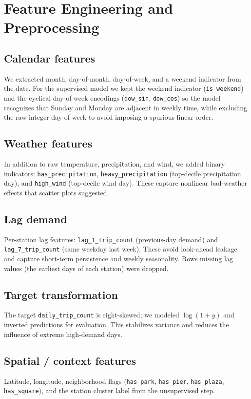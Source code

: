 \documentclass[11pt]{article}
\begin{document}
\section{Feature Engineering and Preprocessing}

\subsection{Calendar features}
We extracted month, day-of-month, day-of-week, and a weekend indicator from
the date. For the supervised model we kept the weekend indicator
(\texttt{is\_weekend}) and the cyclical day-of-week encodings
(\texttt{dow\_sin}, \texttt{dow\_cos}) so the model recognizes that Sunday and
Monday are adjacent in weekly time, while excluding the raw integer
day-of-week to avoid imposing a spurious linear order.

\subsection{Weather features}
In addition to raw temperature, precipitation, and wind, we added binary
indicators: \texttt{has\_precipitation}, \texttt{heavy\_precipitation}
(top-decile precipitation day), and \texttt{high\_wind} (top-decile wind day).
These capture nonlinear bad-weather effects that scatter plots suggested.

\subsection{Lag demand}
Per-station lag features: \texttt{lag\_1\_trip\_count} (previous-day demand)
and \texttt{lag\_7\_trip\_count} (same weekday last week). These avoid
look-ahead leakage and capture short-term persistence and weekly seasonality.
Rows missing lag values (the earliest days of each station) were dropped.

\subsection{Target transformation}
The target \texttt{daily\_trip\_count} is right-skewed; we modeled
$\log(1+y)$ and inverted predictions for evaluation. This stabilizes variance
and reduces the influence of extreme high-demand days.

\subsection{Spatial / context features}
Latitude, longitude, neighborhood flags (\texttt{has\_park},
\texttt{has\_pier}, \texttt{has\_plaza}, \texttt{has\_square}), and the
station cluster label from the unsupervised step.
\end{document}
